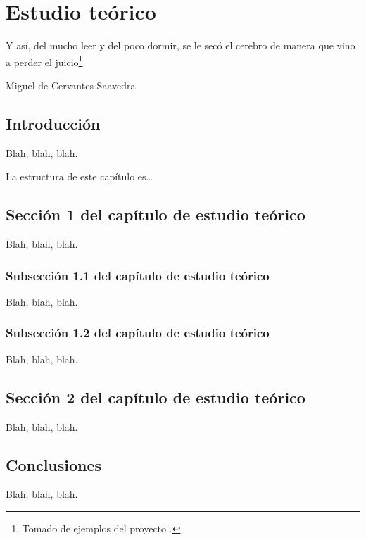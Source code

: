 %

\chapter{Estudio teórico}
\label{cha:estudio-teorico}

\begin{FraseCelebre}
  \begin{Frase}
    Y así, del mucho leer y del poco dormir, se le secó el cerebro de
    manera que vino a perder el juicio\footnote{Tomado de ejemplos del
      proyecto \texis{}.}.
  \end{Frase}
  \begin{Fuente}
    Miguel de Cervantes Saavedra
  \end{Fuente}
\end{FraseCelebre}


\section{Introducción}
\label{sec:theory-introduction}

Blah, blah, blah.

La estructura de este capítulo es\ldots


\section{Sección 1 del capítulo de estudio teórico}
\label{sec:theory-1}

Blah, blah, blah.


\subsection{Subsección 1.1 del capítulo de estudio teórico}
\label{sec:theory-11}

Blah, blah, blah.


\subsection{Subsección 1.2 del capítulo de estudio teórico}
\label{sec:theory-12}

Blah, blah, blah.


\section{Sección 2 del capítulo de estudio teórico}
\label{sec:theory-2}

Blah, blah, blah.




\section{Conclusiones}
\label{sec:theory-conclusions}

Blah, blah, blah.


